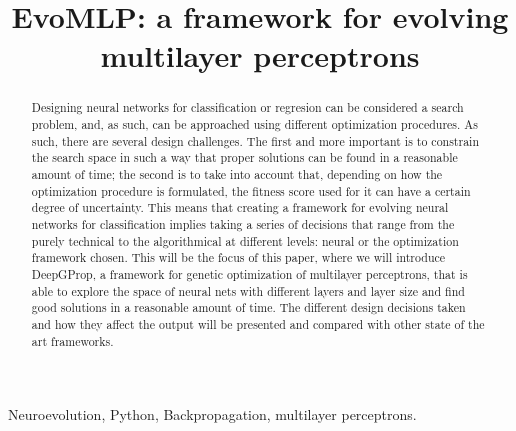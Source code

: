 \documentclass[conference]{IEEEtran}\usepackage[]{graphicx}\usepackage[]{color}
\begin{document}
%
\title{EvoMLP: a framework for evolving multilayer perceptrons}
%
\author{
  \and
  \and
}
%
\maketitle              %

\begin{abstract}

Designing neural networks for classification or regresion can be
considered a search problem, and, as such, can be approached using
different optimization procedures. As such, there are several design
challenges. The first and more important is to constrain the search
space in such a way that proper solutions can be found in a reasonable
amount of time; the second is to take into account that, depending on
how the optimization procedure is formulated, the fitness score used
for it can have a certain degree of uncertainty. This means that
creating a framework for evolving neural networks for classification
implies taking a series of decisions that range from the purely
technical to the algorithmical at different levels: neural or the
optimization framework chosen. This will be the focus of this paper,
where we will introduce DeepGProp, a framework for genetic
optimization of multilayer perceptrons, that is able to explore the
space of neural nets with different layers and layer size and find
good solutions in a reasonable amount of time. The different design
decisions taken and how they affect the output will be presented and
compared with other state of the art frameworks.

\end{abstract}

\begin{IEEEkeywords}
  Neuroevolution, Python, Backpropagation, multilayer perceptrons.
\end{IEEEkeywords}
\end{document}
